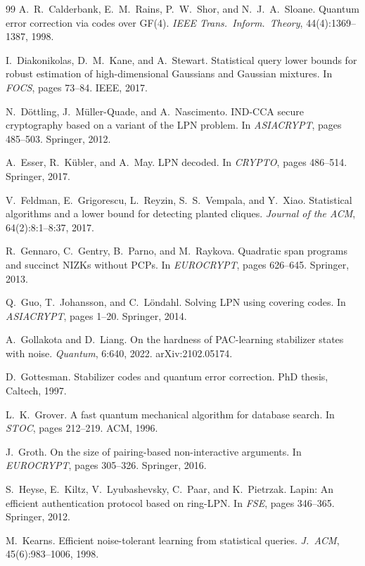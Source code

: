\documentclass[11pt,a4paper]{article}
\theoremstyle{plain}
\theoremstyle{definition}
\begin{document}
\begin{thebibliography}{99}
A.~R.~Calderbank, E.~M.~Rains, P.~W.~Shor, and N.~J.~A.~Sloane.
Quantum error correction via codes over GF(4).
\emph{IEEE Trans.\ Inform.\ Theory}, 44(4):1369--1387, 1998.

I.~Diakonikolas, D.~M.~Kane, and A.~Stewart.
Statistical query lower bounds for robust estimation of high-dimensional Gaussians and Gaussian mixtures.
In \emph{FOCS}, pages 73--84. IEEE, 2017.

N.~D\"ottling, J.~M\"uller-Quade, and A.~Nascimento.
IND-CCA secure cryptography based on a variant of the LPN problem.
In \emph{ASIACRYPT}, pages 485--503. Springer, 2012.

A.~Esser, R.~K\"ubler, and A.~May.
LPN decoded.
In \emph{CRYPTO}, pages 486--514. Springer, 2017.

V.~Feldman, E.~Grigorescu, L.~Reyzin, S.~S.~Vempala, and Y.~Xiao.
Statistical algorithms and a lower bound for detecting planted cliques.
\emph{Journal of the ACM}, 64(2):8:1--8:37, 2017.

R.~Gennaro, C.~Gentry, B.~Parno, and M.~Raykova.
Quadratic span programs and succinct NIZKs without PCPs.
In \emph{EUROCRYPT}, pages 626--645. Springer, 2013.

Q.~Guo, T.~Johansson, and C.~L\"ondahl.
Solving LPN using covering codes.
In \emph{ASIACRYPT}, pages 1--20. Springer, 2014.

A.~Gollakota and D.~Liang.
On the hardness of PAC-learning stabilizer states with noise.
\emph{Quantum}, 6:640, 2022. arXiv:2102.05174.

D.~Gottesman.
Stabilizer codes and quantum error correction.
PhD thesis, Caltech, 1997.

L.~K.~Grover.
A fast quantum mechanical algorithm for database search.
In \emph{STOC}, pages 212--219. ACM, 1996.

J.~Groth.
On the size of pairing-based non-interactive arguments.
In \emph{EUROCRYPT}, pages 305--326. Springer, 2016.

S.~Heyse, E.~Kiltz, V.~Lyubashevsky, C.~Paar, and K.~Pietrzak.
Lapin: An efficient authentication protocol based on ring-LPN.
In \emph{FSE}, pages 346--365. Springer, 2012.

M.~Kearns.
Efficient noise-tolerant learning from statistical queries.
\emph{J.\ ACM}, 45(6):983--1006, 1998.


\end{thebibliography}
\end{document}

